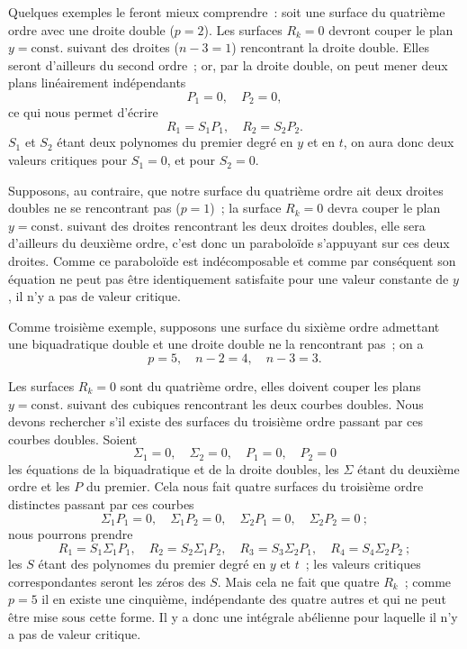 \documentclass{article}
\begin{document}
Quelques exemples le feront mieux comprendre~: soit une surface du quatrième ordre avec une droite double ($p = 2$). Les surfaces $R_{k} = 0$ devront couper le plan $y = \text{const.}$ suivant des droites ($n - 3 = 1$) rencontrant la droite double. Elles seront d'ailleurs du second ordre~; or, par la droite double, on peut mener deux plans linéairement indépendants
\[
P_{1} = 0, \quad P_{2} = 0,
\]
ce qui nous permet d'écrire
\[
R_{1} = S_{1} P_{1}, \quad R_{2} = S_{2} P_{2}.
\]
$S_{1}$ et $S_{2}$ étant deux polynomes du premier degré en $y$ et en $t$, on aura donc deux valeurs critiques pour $S_{1} = 0$, et pour $S_{2} = 0$.

Supposons, au contraire, que notre surface du quatrième ordre ait deux droites doubles ne se rencontrant pas ($p = 1$)~; la surface $R_{k} = 0$ devra couper le plan $y = \text{const.}$ suivant des droites rencontrant les deux droites doubles, elle sera d'ailleurs du deuxième ordre, c'est donc un paraboloïde s'appuyant sur ces deux droites. Comme ce paraboloïde est indécomposable et comme par conséquent son équation ne peut pas être identiquement satisfaite pour une valeur constante de $y$, il n'y a pas de valeur critique.

Comme troisième exemple, supposons une surface du sixième ordre admettant une biquadratique double et une droite double ne la rencontrant pas~; on a
\[
p = 5, \quad n - 2 = 4, \quad n - 3 = 3.
\]

Les surfaces $R_{k} = 0$ sont du quatrième ordre, elles doivent couper les plans $y = \text{const.}$ suivant des cubiques rencontrant les deux courbes doubles. Nous devons rechercher s'il existe des surfaces du troisième ordre passant par ces courbes doubles. Soient
\[
\Sigma_{1} = 0, \quad \Sigma_{2} = 0, \quad P_{1} = 0, \quad P_{2} = 0
\]
les équations de la biquadratique et de la droite doubles, les $\Sigma$ étant du deuxième ordre et les $P$ du premier. Cela nous fait quatre surfaces du troisième ordre distinctes passant par ces courbes
\[
\Sigma_{1} P_{1} = 0, \quad \Sigma_{1} P_{2} = 0, \quad \Sigma_{2} P_{1} = 0, \quad \Sigma_{2} P_{2} = 0~;
\]
nous pourrons prendre
\[
R_{1} = S_{1} \Sigma_{1} P_{1}, \quad R_{2} = S_{2} \Sigma_{1} P_{2}, \quad R_{3} = S_{3} \Sigma_{2} P_{1}, \quad R_{4} = S_{4} \Sigma_{2} P_{2}~;
\]
les $S$ étant des polynomes du premier degré en $y$ et $t$~; les valeurs critiques correspondantes seront les zéros des $S$. Mais cela ne fait que quatre $R_{k}$~; comme $p = 5$ il en existe une cinquième, indépendante des quatre autres et qui ne peut être mise sous cette forme. Il y a donc une intégrale abélienne pour laquelle il n'y a pas de valeur critique.
\end{document}
